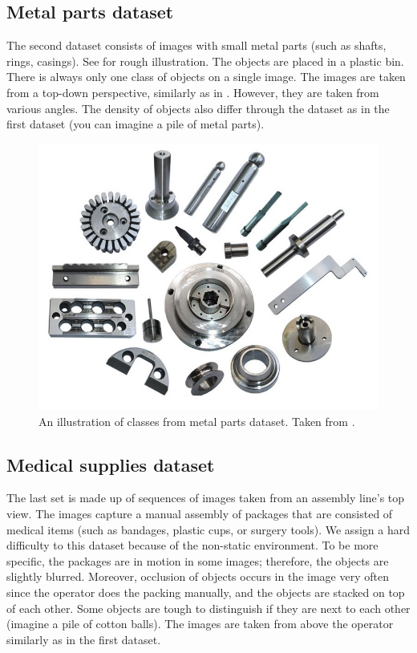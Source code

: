 \subsection*{Metal parts dataset}
The second dataset consists of images with small
metal parts (such as shafts, rings, casings). See  for
rough illustration. The objects are placed in a plastic bin. There is always
only one class of objects on a single image. The images are taken from a
top-down perspective, similarly as in . However, they
are taken from various angles. The density of objects also differ through the
dataset as in the first dataset (you can imagine a pile of metal parts).

\begin{figure}[ht]
	\centering
	\includegraphics[height=0.5\linewidth]{Sources/Figures/metal_parts.jpg}
	\caption{An illustration of classes from metal parts dataset. Taken from
		\cite{parts}.}
	\label{fig:parts}
\end{figure}

\subsection*{Medical supplies dataset}
The last set is made up of sequences of images
taken from an assembly line's top view. The images capture a manual assembly of
packages that are consisted of medical items (such as bandages, plastic cups, or
surgery tools). We assign a hard difficulty to this dataset because of the
non-static environment. To be more specific, the packages are in motion in some
images; therefore, the objects are slightly blurred. Moreover, occlusion of
objects occurs in the image very often since the operator does the packing
manually, and the objects are stacked on top of each other. Some objects are
tough to distinguish if they are next to each other (imagine a pile of cotton
balls). The images are taken from above the operator similarly as in the first
dataset.

